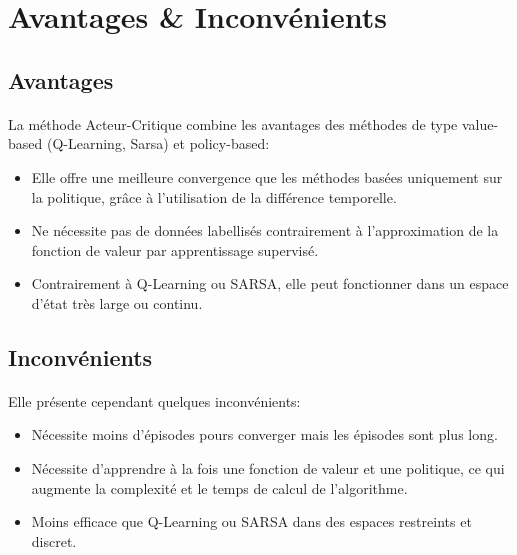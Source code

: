 \section{Avantages \& Inconvénients}

\subsection{Avantages}

\paragraph{}
\begin{samepage}
La méthode Acteur-Critique combine les avantages des méthodes de type value-based (Q-Learning, Sarsa) et policy-based:
\end{samepage}
\begin{itemize}
  \item Elle offre une meilleure convergence que les méthodes basées uniquement sur la politique, grâce à l'utilisation de la différence temporelle.
  \item Ne nécessite pas de données labellisés contrairement à l'approximation de la fonction de valeur par apprentissage supervisé.
  \item Contrairement à Q-Learning ou SARSA, elle peut fonctionner dans un espace d’état très large ou continu.
\end{itemize}
\subsection{Inconvénients}
\paragraph{}
Elle présente cependant quelques inconvénients:
\begin{itemize}
  \item Nécessite moins d’épisodes pours converger mais les épisodes sont plus long.
  \item Nécessite d'apprendre à la fois une fonction de valeur et une politique, ce qui augmente la complexité et le temps de calcul de l'algorithme.
  \item Moins efficace que Q-Learning ou SARSA dans des espaces restreints et discret.
\end{itemize}

